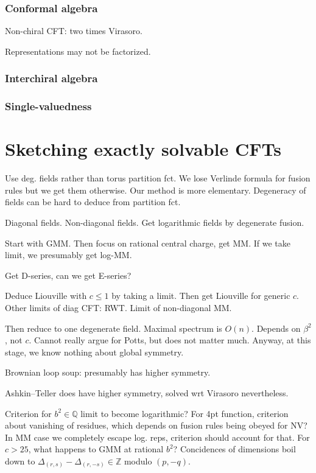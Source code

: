 \documentclass[12pt, a4paper]{article}
\theoremstyle{break}
\begin{document}
\subsubsection{Conformal algebra}

Non-chiral CFT: two times Virasoro.

Representations may not be factorized.

\subsubsection{Interchiral algebra}

\subsubsection{Single-valuedness}


\section{Sketching exactly solvable CFTs}

Use deg. fields rather than torus partition fct. We lose Verlinde formula for fusion rules but we get them otherwise. Our method is more elementary. Degeneracy of fields can be hard to deduce from partition fct. 

Diagonal fields. Non-diagonal fields. Get logarithmic fields by degenerate fusion.

Start with GMM. Then focus on rational central charge, get MM. If we take limit, we presumably get log-MM. 

Get D-series, can we get E-series? 

Deduce Liouville with $c\leq 1$ by taking a limit. Then get Liouville for generic $c$. Other limits of diag CFT: RWT. Limit of non-diagonal MM.

Then reduce to one degenerate field. Maximal spectrum is $O(n)$. Depends on $\beta^2$, not $c$. Cannot really argue for Potts, but does not matter much. Anyway, at this stage, we know nothing about global symmetry.

Brownian loop soup: presumably has higher symmetry.

Ashkin--Teller does have higher symmetry, solved wrt Virasoro nevertheless.

Criterion for $b^2\in\mathbb{Q}$ limit to become logarithmic? For 4pt function, criterion about vanishing of residues, which depends on fusion rules being obeyed for NV? In MM case we completely escape log. reps, criterion should account for that.  
For $c>25$, what happens to GMM at rational $b^2$? Concidences of dimensions boil down to $\Delta_{(r,s)}-\Delta_{(r,-s)} \in \mathbb{Z}$ modulo $(p, -q)$. 
\end{document}
